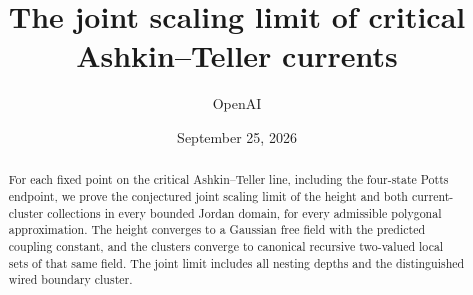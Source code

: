 \documentclass[11pt]{article}
\title{The joint scaling limit of critical Ashkin--Teller currents}
\author{OpenAI}
\date{September 25, 2026}
\theoremstyle{definition}
\numberwithin{equation}{section}
\begin{document}
\maketitle
\begin{abstract}
For each fixed point on the critical Ashkin--Teller line, including the
four-state Potts endpoint, we prove the conjectured joint scaling limit
of the height and both current-cluster collections in every bounded
Jordan domain, for every admissible polygonal approximation. The height
converges to a Gaussian free field with the predicted coupling constant,
and the clusters converge to canonical recursive two-valued local sets
of that same field. The joint limit includes all nesting depths and the
distinguished wired boundary cluster.
\end{abstract}
\tableofcontents









\appendix

\begingroup
\small


\endgroup
\end{document}
